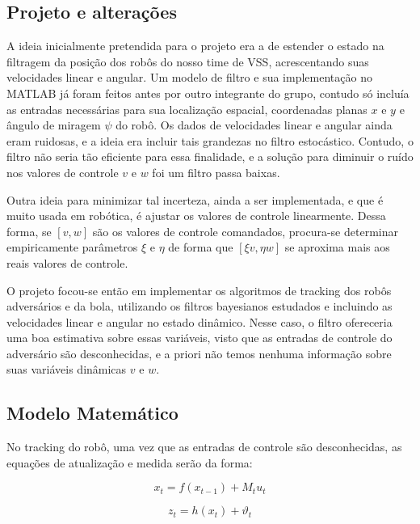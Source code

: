 \documentclass[a4paper,11pt]{article}
\begin{document}
\subsection{Projeto e alterações}

A ideia inicialmente pretendida para o projeto era a de estender o estado na filtragem da posição dos robôs do nosso time de VSS, acrescentando suas velocidades linear e angular. Um modelo de filtro e sua implementação no MATLAB já foram feitos antes por outro integrante do grupo, contudo só incluía as entradas necessárias para sua localização espacial, coordenadas planas $x$ e $y$ e ângulo de miragem $\psi$ do robô. Os dados de velocidades linear e angular ainda eram ruidosas, e a ideia era incluir tais grandezas no filtro estocástico. Contudo, o filtro não seria tão eficiente para essa finalidade, e a solução para diminuir o ruído nos valores de controle $v$ e $w$ foi um filtro passa baixas.

Outra ideia para minimizar tal incerteza, ainda a ser implementada, e que é muito usada em robótica, é ajustar os valores de controle linearmente. Dessa forma, se $[v,w]$ são os valores de controle comandados, procura-se determinar empiricamente parâmetros $\xi$ e $\eta$ de forma que $[\xi v,\eta w]$ se aproxima mais aos reais valores de controle.

O projeto focou-se então em implementar os algoritmos de tracking dos robôs adversários e da bola, utilizando os filtros bayesianos estudados e incluindo as velocidades linear e angular no estado dinâmico. Nesse caso, o filtro ofereceria uma boa estimativa sobre essas variáveis, visto que as entradas de controle do adversário são desconhecidas, e a priori não temos nenhuma informação sobre suas variáveis dinâmicas $v$ e $w$.

\subsection{Modelo Matemático}

No tracking do robô, uma vez que as entradas de controle são desconhecidas, as equações de atualização e medida serão da forma:

\begin{equation}
\label{tracking_motion}
x_t=f(x_{t-1})+M_t u_t
\end{equation}

\begin{equation}
\label{tracking_measurement}
z_t=h(x_t)+\vartheta_t
\end{equation}
\end{document}
